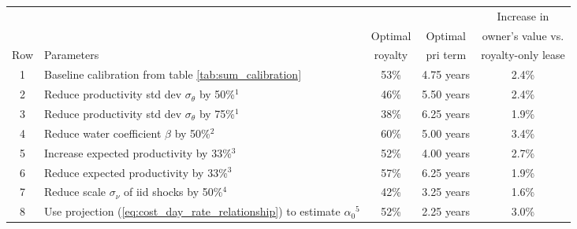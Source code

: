 \begin{tabular} {c l c c c } \midrule \midrule 
 & & & & Increase in \\ 
 & & Optimal & Optimal &  owner's value vs. \\ 
Row & Parameters & royalty & pri term & royalty-only lease \\ 
\midrule 
1 & Baseline calibration from table \ref{tab:sum_calibration} &       53\% &     4.75 years &      2.4\% \\ 
2 & Reduce productivity std dev $\sigma_\theta$ by 50\%$^1$ &       46\% &     5.50 years &      2.4\% \\ 
3 & Reduce productivity std dev $\sigma_\theta$ by 75\%$^1$ &       38\% &     6.25 years &      1.9\% \\ 
4 & Reduce water coefficient $\beta$ by 50\%$^2$ &       60\% &     5.00 years &      3.4\% \\ 
5 & Increase expected productivity by 33\%$^3$ &       52\% &     4.00 years &      2.7\% \\ 
6 & Reduce expected productivity by 33\%$^3$ &       57\% &     6.25 years &      1.9\% \\ 
7 & Reduce scale $\sigma_\nu$ of iid shocks by 50\%$^4$ &       42\% &     3.25 years &      1.6\% \\ 
8 & Use projection (\ref{eq:cost_day_rate_relationship}) to estimate $\alpha_0$$^5$ &       52\% &     2.25 years &      3.0\% \\ 
\midrule 
\end{tabular}